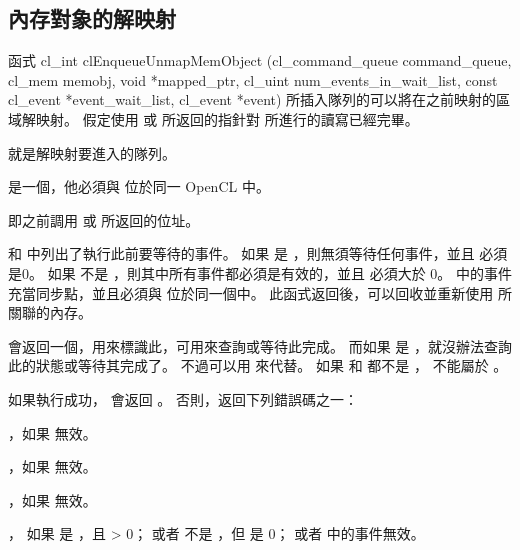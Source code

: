 \subsection{內存對象的解映射}
函式
\startclc
cl_int clEnqueueUnmapMemObject (cl_command_queue command_queue,
			cl_mem memobj,
			void *mapped_ptr,
			cl_uint num_events_in_wait_list,
			const cl_event *event_wait_list,
			cl_event *event)
\stopclc
所插入隊列的可以將在之前映射的區域解映射。
假定使用  或  所返回的指針對  所進行的讀寫已經完畢。

 就是解映射要進入的隊列。

 是一個，他必須與  位於同一 OpenCL 中。

 即之前調用  或  所返回的位址。

 和  中列出了執行此前要等待的事件。
如果  是 ，則無須等待任何事件，並且  必須是0。
如果  不是 ，則其中所有事件都必須是有效的，並且  必須大於 0。
 中的事件充當同步點，並且必須與  位於同一個中。
此函式返回後，可以回收並重新使用  所關聯的內存。

 會返回一個，用來標識此，可用來查詢或等待此完成。
而如果  是 ，就沒辦法查詢此的狀態或等待其完成了。
不過可以用  來代替。
如果  和  都不是 ，  不能屬於 。

如果執行成功，  會返回 。
否則，返回下列錯誤碼之一：
\startigBase
\item {}，如果  無效。
\item {}，如果  無效。

\item {}，如果  無效。

\item {}，
  如果  是 ，且  > 0；
  或者  不是 ，但  是 0；
  或者  中的事件無效。

